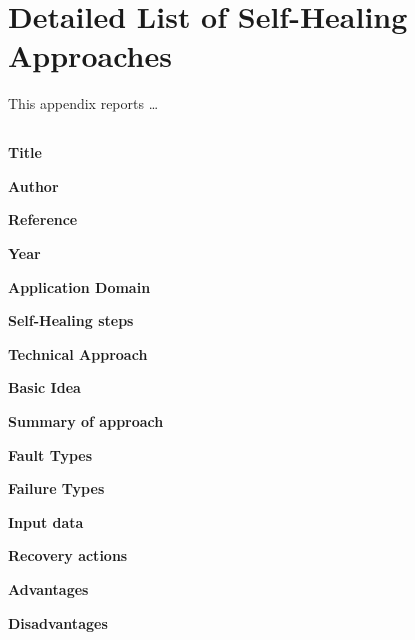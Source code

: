 \appendix
\chapter{Detailed List of Self-Healing Approaches}
\label{ap:approches}

This appendix reports \ldots 

\section{} \label{}
\begin{compactitem}
\item[\textbf{Title}] 
\item[\textbf{Author}] 
\item[\textbf{Reference}] 
\item[\textbf{Year}] 
\item[\textbf{Application Domain}]
\item[\textbf{Self-Healing steps}] 
\item[\textbf{Technical Approach}]
\item[\textbf{Basic Idea}] 
\item[\textbf{Summary of approach}]
\item[\textbf{Fault Types}]
\item[\textbf{Failure Types}]
\item[\textbf{Input data}] 
\item[\textbf{Recovery actions}]
\item[\textbf{Advantages}] 
\item[\textbf{Disadvantages}] 
\end{compactitem}
